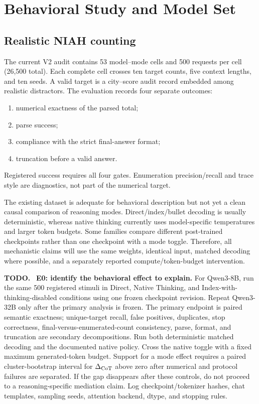 \documentclass[11pt]{article}
\newenvironment{todobox}
  {\begin{center}\begin{minipage}{0.95\linewidth}\color{todored}\textbf{TODO.}~}
  {\end{minipage}\end{center}}
\begin{document}
\section{Behavioral Study and Model Set}

\subsection{Realistic NIAH counting}

The current V2 audit contains 53 model--mode cells and 500 requests per cell (26,500 total). Each complete cell crosses ten target counts, five context lengths, and ten seeds. A valid target is a city--score audit record embedded among realistic distractors. The evaluation records four separate outcomes:
\begin{enumerate}
  \item numerical exactness of the parsed total;
  \item parse success;
  \item compliance with the strict final-answer format;
  \item truncation before a valid answer.
\end{enumerate}
Registered success requires all four gates. Enumeration precision/recall and trace style are diagnostics, not part of the numerical target.

The existing dataset is adequate for behavioral description but not yet a clean causal comparison of reasoning modes. Direct/index/bullet decoding is usually deterministic, whereas native thinking currently uses model-specific temperatures and larger token budgets. Some families compare different post-trained checkpoints rather than one checkpoint with a mode toggle. Therefore, all mechanistic claims will use the same weights, identical input, matched decoding where possible, and a separately reported compute/token-budget intervention.

\begin{todobox}
\textbf{E0: identify the behavioral effect to explain.} For Qwen3-8B, run the same 500 registered stimuli in Direct, Native Thinking, and Index-with-thinking-disabled conditions using one frozen checkpoint revision. Repeat Qwen3-32B only after the primary analysis is frozen. The primary endpoint is paired semantic exactness; unique-target recall, false positives, duplicates, stop correctness, final-versus-enumerated-count consistency, parse, format, and truncation are secondary decompositions. Run both deterministic matched decoding and the documented native policy. Cross the native toggle with a fixed maximum generated-token budget. Support for a mode effect requires a paired cluster-bootstrap interval for $\Delta_{\rm CoT}$ above zero after numerical and protocol failures are separated. If the gap disappears after these controls, do not proceed to a reasoning-specific mediation claim. Log checkpoint/tokenizer hashes, chat templates, sampling seeds, attention backend, dtype, and stopping rules.
\end{todobox}
\end{document}
